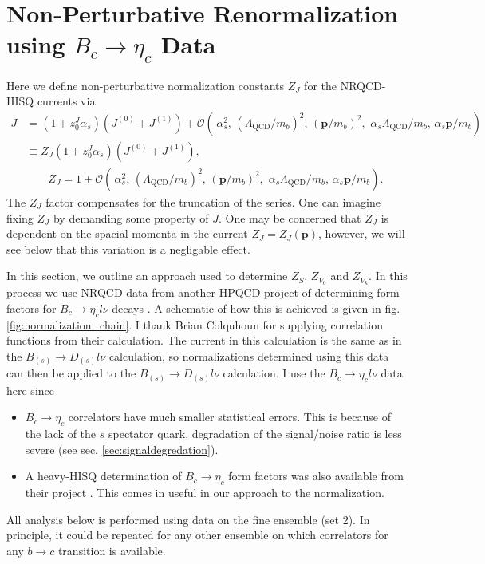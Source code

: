 \section{Non-Perturbative Renormalization using $B_c\to \eta_c$ Data}
\label{sec:Bcetac}

Here we define non-perturbative normalization constants $Z_J$ for the NRQCD-HISQ currents via 
\begin{align}
  \nonumber
	J &= ( 1 + z^J_0 \alpha_s )( J^{(0)} + J^{(1)} ) + \mathcal{O}(\, \alpha_s^2, \, (\Lambda_{\text{QCD}}/m_b)^2, \, ({\textbf{p}}/m_b)^2,\,\,\alpha_s \Lambda_{\text{QCD}} / m_b,\, \alpha_s {\textbf{p}}/m_b ) \\
	&\equiv Z_{J}( 1 + z^J_0 \alpha_s )( J^{(0)} + J^{(1)} ), \\ \nonumber &\quad\quad Z_{J} = 1 +  \mathcal{O}(\, \alpha_s^2, \, (\Lambda_{\text{QCD}}/m_b)^2, \, ({\textbf{p}}/m_b)^2,\,\,\alpha_s \Lambda_{\text{QCD}} / m_b,\, \alpha_s {\textbf{p}}/m_b ).
	\label{eq:overall}
\end{align}
The $Z_J$ factor compensates for the truncation of the series. One can imagine fixing $Z_J$ by demanding some property of $J$. One may be concerned that $Z_J$ is dependent on the spacial momenta in the current $Z_J=Z_J({\textbf{p}})$, however, we will see below that this variation is a negligable effect.

In this section, we outline an approach used to determine $Z_S$, $Z_{V_0}$ and $Z_{V_k}$. In this process we use NRQCD data from another HPQCD project of determining form factors for $B_c \to \eta_c l\nu$ decays \cite{Colquhoun:2016osw}. A schematic of how this is achieved is given in fig. \ref{fig:normalization_chain}. I thank Brian Colquhoun for supplying correlation functions from their calculation. The current in this calculation is the same as in the $B_{(s)}\to D_{(s)}l\nu$ calculation, so normalizations determined using this data can then be applied to the $B_{(s)}\to D_{(s)}l\nu$ calculation. I use the $B_c \to \eta_c l\nu$ data here since
\begin{itemize}
\item
  $B_c\to \eta_c$ correlators have much smaller statistical errors. This is because of the lack of the $s$ spectator quark, degradation of the signal/noise ratio is less severe (see sec. \ref{sec:signaldegredation}).
\item
  A heavy-HISQ determination of $B_c\to \eta_c$ form factors was also available from their project \cite{Colquhoun:2016osw}. This comes in useful in our approach to the normalization.
\end{itemize}
All analysis below is performed using data on the fine ensemble (set 2). In principle, it could be repeated for any other ensemble on which correlators for any $b\to c$ transition is available.

